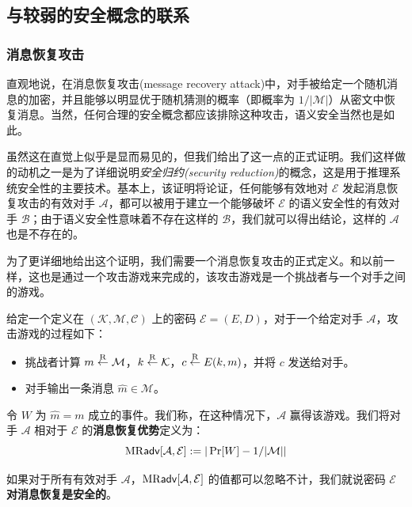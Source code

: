 \subsection{与较弱的安全概念的联系}\label{subsec:2-2-3}

\subsubsection{消息恢复攻击}\label{subsubsec:2-2-3-1}

直观地说，在消息恢复攻击(message recovery attack)中，对手被给定一个随机消息的加密，并且能够以明显优于随机猜测的概率（即概率为 ${1}/{|\mathcal{M}|}$）从密文中恢复消息。当然，任何合理的安全概念都应该排除这种攻击，语义安全当然也是如此。

虽然这在直觉上似乎是显而易见的，但我们给出了这一点的正式证明。我们这样做的动机之一是为了详细说明\emph{安全归约(security reduction)}的概念，这是用于推理系统安全性的主要技术。基本上，该证明将论证，任何能够有效地对 $\mathcal{E}$ 发起消息恢复攻击的有效对手 $\mathcal{A}$，都可以被用于建立一个能够破坏 $\mathcal{E}$ 的语义安全性的有效对手 $\mathcal{B}$；由于语义安全性意味着不存在这样的 $\mathcal{B}$，我们就可以得出结论，这样的 $\mathcal{A}$也是不存在的。

为了更详细地给出这个证明，我们需要一个消息恢复攻击的正式定义。和以前一样，这也是通过一个攻击游戏来完成的，该攻击游戏是一个挑战者与一个对手之间的游戏。

\begin{game}[消息恢复]\label{game:2-2}
给定一个定义在 $(\mathcal{K},\mathcal{M},\mathcal{C})$ 上的密码 $\mathcal{E}=(E,D)$，对于一个给定对手 $\mathcal{A}$，攻击游戏的过程如下：
\begin{itemize}
	\item 挑战者计算 $m\overset{\rm R}\leftarrow\mathcal{M}$，$k\overset{\rm R}\leftarrow\mathcal{K}$，$c\overset{\rm R}\leftarrow E(k,m)$，并将 $c$ 发送给对手。
	\item 对手输出一条消息 $\hat m\in\mathcal{M}$。
\end{itemize}
令 $W$ 为 $\hat m=m$ 成立的事件。我们称，在这种情况下，$\mathcal{A}$ 赢得该游戏。我们将对手 $\mathcal{A}$ 相对于 $\mathcal{E}$ 的\textbf{消息恢复优势}定义为：
$$
{\rm MR\mathsf{adv}}[\mathcal{A},\mathcal{E}]:=|\Pr[W] -{1}/{|\mathcal{M}|}|
$$
\end{game}

\begin{definition}[针对消息恢复的安全性]
如果对于所有有效对手 $\mathcal{A}$，${\rm MR\mathsf{adv}}[\mathcal{A},\mathcal{E}]$ 的值都可以忽略不计，我们就说密码 $\mathcal{E}$ \textbf{对消息恢复是安全的}。
\end{definition}

